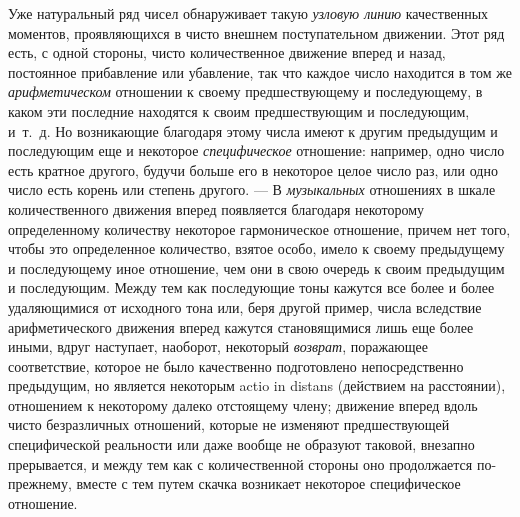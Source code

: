 Уже натуральный ряд чисел обнаруживает такую
{\em узловую линию} качественных моментов,
проявляющихся в чисто внешнем поступательном движении. Этот ряд есть, с
одной стороны, чисто количественное движение вперед и назад, постоянное
прибавление или убавление, так что каждое число находится в том же
{\em арифметическом} отношении к своему предшествующему
и последующему, в каком эти последние находятся к своим предшествующим и
последующим, и~т.~д. Но возникающие благодаря этому числа имеют к другим
предыдущим и последующим еще и некоторое
{\em специфическое} отношение: например, одно число
есть кратное другого, будучи больше его в некоторое целое число раз, или
одно число есть корень или степень другого. — В
{\em музыкальных} отношениях в шкале количественного
движения вперед появляется благодаря некоторому определенному количеству
некоторое гармоническое отношение, причем нет того, чтобы это определенное
количество, взятое особо, имело к своему предыдущему и последующему иное
отношение, чем они в свою очередь к своим предыдущим и последующим. Между
тем как последующие тоны кажутся все более и более удаляющимися от
исходного тона или, беря другой пример, числа вследствие арифметического
движения вперед кажутся становящимися лишь еще более иными, вдруг
наступает, наоборот, некоторый {\em возврат},
поражающее соответствие, которое не было качественно подготовлено
непосредственно предыдущим, но является некоторым actio in distans
(действием на расстоянии), отношением к некоторому далеко отстоящему члену;
движение вперед вдоль чисто безразличных отношений, которые не изменяют
предшествующей специфической реальности или даже вообще не образуют
таковой, внезапно прерывается, и между тем как с количественной стороны оно
продолжается по-прежнему, вместе с тем путем скачка возникает некоторое
специфическое отношение.


